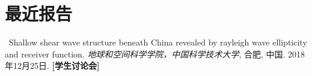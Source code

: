 \section*{最近报告}
\begin{etaremune}
\item
    \Xiao\
    Shallow shear wave structure beneath China revealed by rayleigh wave ellipticity and receiver function.
    \textit{地球和空间科学学院，中国科学技术大学}, 合肥, 中国.
    2018年12月25日.
    \textbf{[学生讨论会]}
\end{etaremune}
